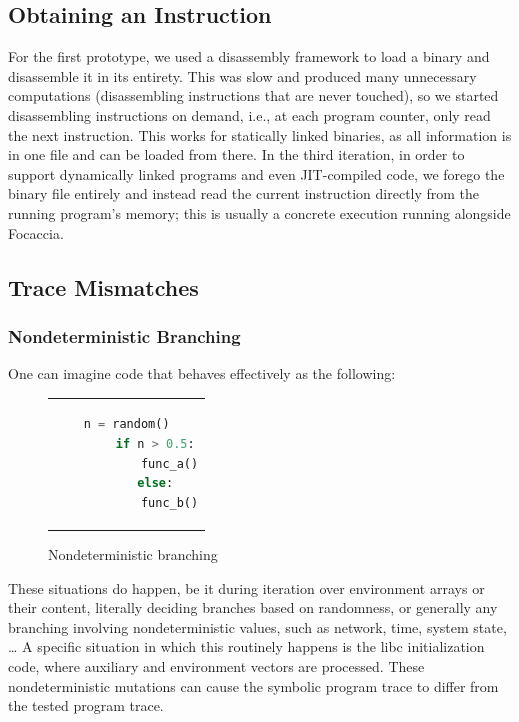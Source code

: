 \subsection{Obtaining an Instruction}

For the first prototype, we used a disassembly framework to load a binary and disassemble it in its entirety. This was
slow and produced many unnecessary computations (disassembling instructions that are never touched), so we started
disassembling instructions on demand, i.e., at each program counter, only read the next instruction. This works for
statically linked binaries, as all information is in one file and can be loaded from there. In the third iteration, in
order to support dynamically linked programs and even \ac{JIT}-compiled code, we forego the binary file entirely and
instead read the current instruction directly from the running program's memory; this is usually a concrete execution
running alongside Focaccia.

\subsection{Trace Mismatches}\label{sec:trace_mismatch}

\subsubsection{Nondeterministic Branching}

One can imagine code that behaves effectively as the following:

\begin{figure}[htbp]
    \centering
    \begin{tabular}{c}
    \begin{lstlisting}[language=Python]
        n = random()
        if n > 0.5:
            func_a()
        else:
            func_b()
    \end{lstlisting}
    \end{tabular}
    \caption{Nondeterministic branching}\label{fig:random_branching}
\end{figure}

These situations do happen, be it during iteration over environment arrays or their content, literally deciding branches
based on randomness, or generally any branching involving nondeterministic values, such as network, time, system state,
… A specific situation in which this routinely happens is the libc initialization code, where auxiliary and environment
vectors are processed. These nondeterministic mutations can cause the symbolic program trace to differ from the tested
program trace.

